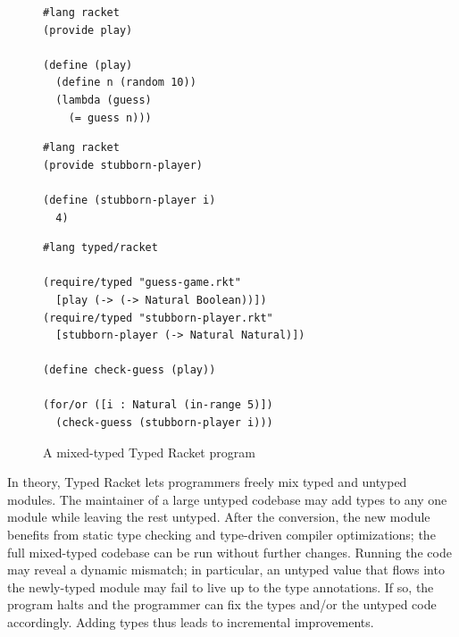 \begin{figure}[h]
  \begin{minipage}[t]{0.45\columnwidth}
    \begin{lstlisting}
#lang racket
(provide play)

(define (play)
  (define n (random 10))
  (lambda (guess)
    (= guess n)))
    \end{lstlisting}

  \end{minipage}\begin{minipage}[t]{0.45\columnwidth}
    \begin{lstlisting}
#lang racket
(provide stubborn-player)

(define (stubborn-player i)
  4)
    \end{lstlisting}

  \end{minipage}

  \smallskip
  \begin{centering}
    \begin{minipage}{0.6\columnwidth}
      \begin{lstlisting}
#lang typed/racket

(require/typed "guess-game.rkt"
  [play (-> (-> Natural Boolean))])
(require/typed "stubborn-player.rkt"
  [stubborn-player (-> Natural Natural)])

(define check-guess (play))

(for/or ([i : Natural (in-range 5)])
  (check-guess (stubborn-player i)))
      \end{lstlisting}
    \end{minipage}
  \end{centering}

  \caption{A mixed-typed Typed Racket program~\cite{gtnffvf-jfp-2019}}
  \label{fig:guess-game}
\end{figure}

In theory, Typed Racket lets programmers freely mix typed and untyped modules.
The maintainer of a large untyped codebase may add types to any
 one module while leaving the rest untyped.
After the conversion, the new module benefits from static type checking
 and type-driven compiler optimizations; the full mixed-typed codebase can
 be run without further changes.
Running the code may reveal a dynamic mismatch; in particular, an untyped value
 that flows into the newly-typed module may fail to live up to the type annotations.
If so, the program halts and the programmer can fix the types
 and/or the untyped code accordingly.
Adding types thus leads to incremental improvements.

